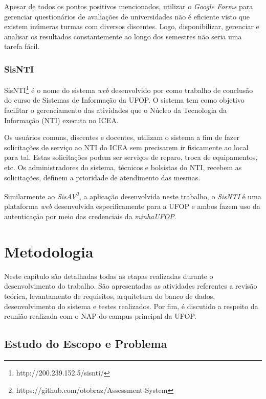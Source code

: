 \documentclass[
  12pt,       %
  openright,      %
  oneside,      %
  a4paper,      %
  english,      %
  french,        %
  spanish,     %
  brazil        %
  ]{abntex2-decsi}
\begin{document}
        Apesar de todos os pontos positivos mencionados, utilizar o \textit{Google Forms} para gerenciar questionários de avaliações de universidades não é eficiente visto que existem inúmeras turmas com diversos discentes. Logo, disponibilizar, gerenciar e analisar os resultados constantemente ao longo dos semestres não seria uma tarefa fácil.

        \subsection{SisNTI}

        SisNTI\footnote{http://200.239.152.5/sisnti/} é o nome do sistema \textit{web} desenvolvido por  como trabalho de conclusão do curso de Sistemas de Informação da UFOP. O sistema tem como objetivo facilitar o gerenciamento das atividades que o Núcleo da Tecnologia da Informação (NTI) executa no ICEA. 

        Os usuários comuns, discentes e docentes, utilizam o sistema a fim de fazer solicitações de serviço ao NTI do ICEA sem precisarem ir fisicamente ao local para tal. Estas solicitações podem ser serviços de reparo, troca de equipamentos, etc. Os administradores do sistema, técnicos e bolsistas do NTI, recebem as solicitações, definem a prioridade de atendimento das mesmas.

        Similarmente ao \textit{SisAV}\footnote{https://github.com/otobraz/Assessment-System}, a aplicação desenvolvida neste trabalho, o \textit{SisNTI} é uma plataforma \textit{web} desenvolvida especificamente para a UFOP e ambos fazem uso da autenticação por meio das credenciais da \textit{minhaUFOP}. 

\chapter{Metodologia}\label{metodologia}
        Neste capítulo são detalhadas todas as etapas realizadas durante o desenvolvimento do trabalho. São apresentadas as atividades referentes a revisão teórica, levantamento de requisitos, arquitetura do banco de dados, desenvolvimento do sistema e testes realizados. Por fim, é discutido a respeito da reunião realizada com o NAP do campus principal da UFOP.

    \section{Estudo do Escopo e Problema}
\end{document}
